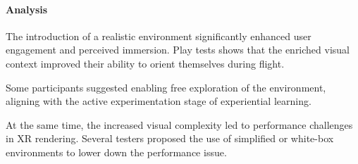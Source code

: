 \paragraph{Analysis}

The introduction of a realistic environment significantly enhanced user engagement and perceived immersion. Play tests shows that the enriched visual context improved their ability to orient themselves during flight.

Some participants suggested enabling free exploration of the environment, aligning with the active experimentation stage of experiential learning.

At the same time, the increased visual complexity led to performance challenges in XR rendering. Several testers proposed the use of simplified or white-box environments to lower down the performance issue.